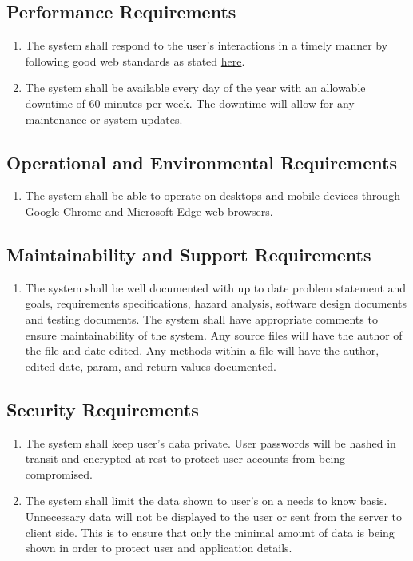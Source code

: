 \documentclass[12pt]{article}
\begin{document}
\subsection{Performance Requirements}
\begin{enumerate}[PR\arabic*.]
	\item The system shall respond to the user's interactions in a timely manner by following good web
	      standards as stated \href{https://web.dev/vitals/}{here}.
	\item The system shall be available every day of the year with an allowable downtime of 60 minutes per
	      week. The downtime will allow for any maintenance or system updates.
\end{enumerate}

\subsection{Operational and Environmental Requirements}
\begin{enumerate}[OE\arabic*.]
	\item The system shall be able to operate on desktops and mobile devices through Google Chrome and
	      Microsoft Edge web browsers.
\end{enumerate}

\subsection{Maintainability and Support Requirements}
\begin{enumerate}[MS\arabic*.]
	\item The system shall be well documented with up to date problem statement and goals, requirements
	      specifications, hazard analysis, software design documents and testing documents. The system shall
	      have appropriate comments to ensure maintainability of the system. Any source files will have the
	      author of the file and date edited. Any methods within a file will have the author, edited date,
	      param, and return values documented.
\end{enumerate}

\subsection{Security Requirements}
\begin{enumerate}[SR\arabic*.]
	\item The system shall keep user's data private. User passwords will be hashed in transit and encrypted
	      at rest to protect user accounts from being compromised.
	\item The system shall limit the data shown to user's on a needs to know basis. Unnecessary data will not
	      be displayed to the user or sent from the server to client side. This is to ensure that only the
	      minimal amount of data is being shown in order to protect user and application details.
\end{enumerate}
\end{document}
